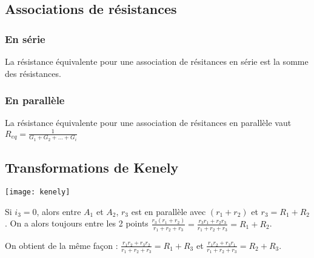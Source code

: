 \documentclass[french]{yLectureNote}
\begin{document}
\subsection{Associations de résistances}
\subsubsection{En série}
\begin{theorem}
 La résistance équivalente pour une association de résitances en série est la somme des résistances.
\end{theorem}
\subsubsection{En parallèle}
\begin{theorem}
 La résistance équivalente pour une association de résitances en parallèle vaut \(R_{eq} = \frac{1}{G_1+G_2+\dots+G_i}\)
\end{theorem}
%

\subsection{Transformations de Kenely}
\texttt{[image: kenely]}

Si $i_3 = 0$, alors entre $A_1$ et $A_2$, $r_3$ est en parallèle avec $(r_1+r_2)$ et $r_3 = R_1+R_2$. On a alors toujours entre les 2 points $\frac{r_3(r_1+r_2)}{r_1+r_2+r_3} = \frac{r_3r_1+r_2r_3}{r_1+r_2+r_3} = R_1+R_2$.

On obtient de la m\^eme façon  : $\frac{r_1r_2+r_3r_2}{r_1+r_2+r_3} = R_1+R_3$ et $\frac{r_1r_2+r_3r_1}{r_1+r_2+r_3} = R_2+R_3$.
\end{document}
